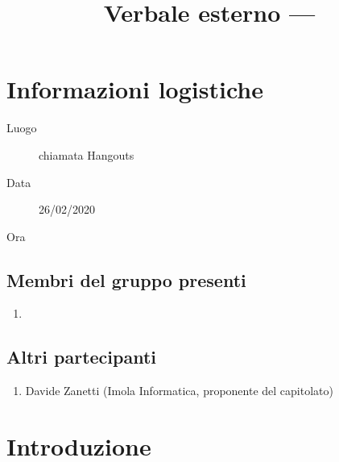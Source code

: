 \documentclass{article}
\title{Verbale esterno --- \dataVerbale{}}
\begin{document}


\section{Informazioni logistiche}%
\label{sec:informazioni_logistiche}

\begin{description}
  \item [Luogo] chiamata Hangouts
  \item [Data] 26/02/2020
  \item [Ora]   
\end{description}

\subsection{Membri del gruppo presenti}%
\label{sub:membri_del_gruppo_presenti}

\begin{enumerate}
  \item {}
\end{enumerate}

\subsection{Altri partecipanti}%
\label{sub:altri_partecipanti}

\begin{enumerate}
  \item Davide Zanetti (Imola Informatica, proponente del capitolato)
\end{enumerate}


\section{Introduzione}%
\label{sec:introduzione}
\end{document}
